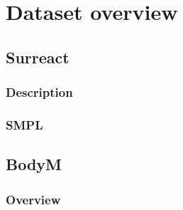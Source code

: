 \chapter{Dataset overview}
\section{Surreact}
\subsection{Description}
\subsection{SMPL}
\section{BodyM}
\subsection{Overview}